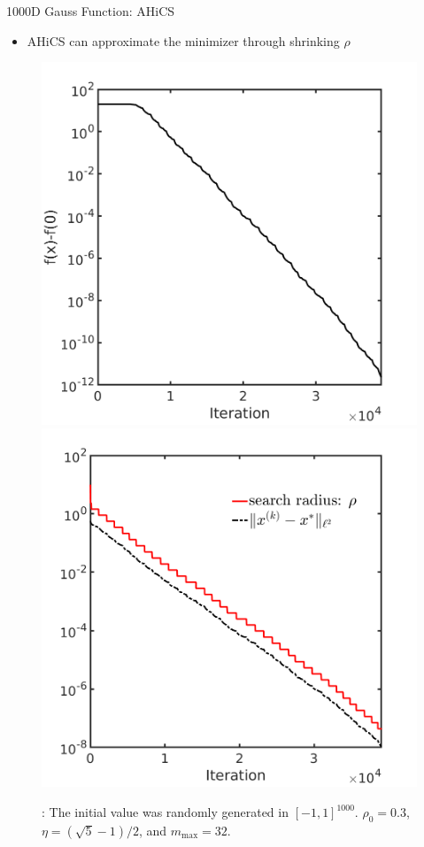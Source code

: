 \documentclass{beamer}
\begin{document}
\begin{frame}{1000D Gauss Function: AHiCS}
\normalsize{
	\begin{itemize}
		\item AHiCS can approximate the minimizer through shrinking $\rho$ 
	\end{itemize}
	}
\begin{figure}[!htbp]
	\centering
	  \includegraphics[scale=0.2]{./figures/gauss1000D.png}
	  \includegraphics[scale=0.2]{./figures/gauss1000D_dist.png}
\footnotesize{
	\caption{: 
	The initial value was randomly generated in $[-1,1]^{1000}$.
	$\rho_0=0.3$, $\eta=(\sqrt{5}-1)/2$, and $m_{\max}=32$.}
	}
\end{figure}

\end{frame}
\end{document}
